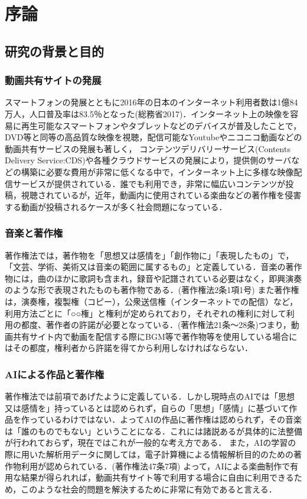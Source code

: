 \chapter{序論}
\section{研究の背景と目的}
\subsection{動画共有サイトの発展}
スマートフォンの発展とともに2016年の日本のインターネット利用者数は1億84万人，人口普及率は83.5％となった(総務省2017)．インターネット上の映像を容易に再生可能なスマートフォンやタブレットなどのデバイスが普及したことで，DVD等と同等の高品質な映像を視聴，配信可能なYoutube\cite{webpage}やニコニコ動画\cite{webpage9}などの動画共有サービスの発展も著しく，
コンテンツデリバリーサービス(Contents Delivery Service:CDS)や各種クラウドサービスの発展により，提供側のサーバなどの構築に必要な費用が非常に低くなる中で，インターネット上に多様な映像配信サービスが提供されている．誰でも利用でき，非常に幅広いコンテンツが投稿，視聴されているが，近年，動画内に使用されている楽曲などの著作権を侵害する動画が投稿されるケースが多く社会問題になっている．
\subsection{音楽と著作権}
著作権法では，著作物を「思想又は感情を」「創作物に」「表現したもの」で，「文芸、学術、美術又は音楽の範囲に属するもの」と定義している．音楽の著作物には，曲のほかに歌詞も含まれ，録音や記譜されている必要はなく，即興演奏のような形で表現されたものも著作物である．(著作権法2条1項1号)
また著作権は，演奏権，複製権（コピー），公衆送信権（インターネットでの配信）など，利用方法ごとに「○○権」と権利が定められており，それぞれの権利に対して利用の都度、著作者の許諾が必要となっている．(著作権法21条～28条)つまり，動画共有サイト内で動画を配信する際にBGM等で著作物等を使用している場合にはその都度，権利者から許諾を得てから利用しなければならない．
\newpage
\subsection{AIによる作品と著作権}
著作権法では前項であげたように定義している．しかし現時点のAIでは「思想又は感情を」持っているとは認められず，自らの「思想」「感情」に基づいて作品を作っているわけではない．よってAIの作品に著作権は認められず，その音楽は「誰のものでもない」ということになる．これには諸説あるが具体的に法整備が行われておらず，現在ではこれが一般的な考え方である．
また，AIの学習の際に用いた解析用データに関しては，電子計算機による情報解析目的のための著作物利用が認められている．(著作権法47条7項)
よって，AIによる楽曲制作で有用な結果が得られれば，動画共有サイト等で利用する場合に自由に利用できるため，このような社会的問題を解決するために非常に有効であると言える．

